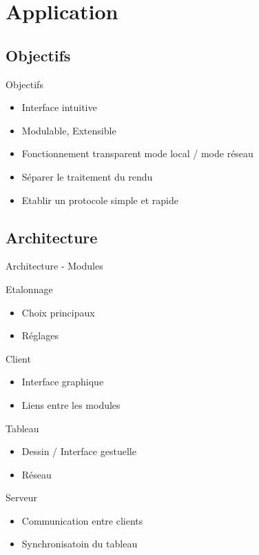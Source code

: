 \documentclass{beamer}
\begin{document}
	\section{Application}
	
		\subsection{Objectifs}
		\begin{frame}{Objectifs}
			\begin{itemize}
				\item Interface intuitive
				\item Modulable, Extensible
				\item Fonctionnement transparent mode local / mode réseau
				\item Séparer le traitement du rendu
				\item Etablir un protocole simple et rapide
			\end{itemize}
		\end{frame}
	
		\subsection{Architecture}
		\begin{frame}{Architecture - Modules}
			\pause
			\begin{block}{Etalonnage}
				\begin{itemize}
					\item Choix principaux
					\item Réglages
				\end{itemize}
			\end{block}
			\pause
			\begin{block}{Client}
				\begin{itemize}
					\item Interface graphique
					\item Liens entre les modules
				\end{itemize}
			\end{block}
			\pause
			\begin{block}{Tableau}
				\begin{itemize}
					\item Dessin / Interface gestuelle
					\item Réseau
				\end{itemize}
			\end{block}
			\pause
			\begin{block}{Serveur}
				\begin{itemize}
					\item Communication entre clients
					\item Synchronisatoin du tableau
				\end{itemize}
			\end{block}
		\end{frame}
	
\end{document}
